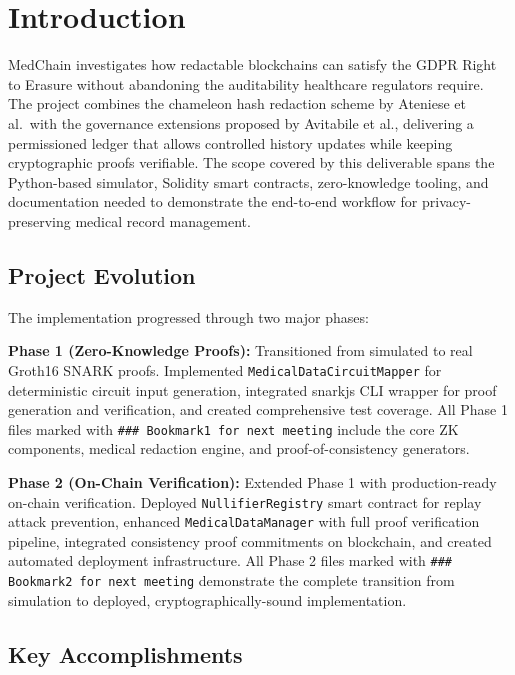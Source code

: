 \section{Introduction}

MedChain investigates how redactable blockchains can satisfy the GDPR Right to Erasure without abandoning the auditability healthcare regulators require. The project combines the chameleon hash redaction scheme by Ateniese et al.\ with the governance extensions proposed by Avitabile et al., delivering a permissioned ledger that allows controlled history updates while keeping cryptographic proofs verifiable. The scope covered by this deliverable spans the Python-based simulator, Solidity smart contracts, zero-knowledge tooling, and documentation needed to demonstrate the end-to-end workflow for privacy-preserving medical record management.

\subsection{Project Evolution}

The implementation progressed through two major phases:

\textbf{Phase 1 (Zero-Knowledge Proofs):} Transitioned from simulated to real Groth16 SNARK proofs. Implemented \texttt{MedicalDataCircuitMapper} for deterministic circuit input generation, integrated snarkjs CLI wrapper for proof generation and verification, and created comprehensive test coverage. All Phase 1 files marked with \texttt{\#\#\# Bookmark1 for next meeting} include the core ZK components, medical redaction engine, and proof-of-consistency generators.

\textbf{Phase 2 (On-Chain Verification):} Extended Phase 1 with production-ready on-chain verification. Deployed \texttt{NullifierRegistry} smart contract for replay attack prevention, enhanced \texttt{MedicalDataManager} with full proof verification pipeline, integrated consistency proof commitments on blockchain, and created automated deployment infrastructure. All Phase 2 files marked with \texttt{\#\#\# Bookmark2 for next meeting} demonstrate the complete transition from simulation to deployed, cryptographically-sound implementation.

\subsection{Key Accomplishments}

